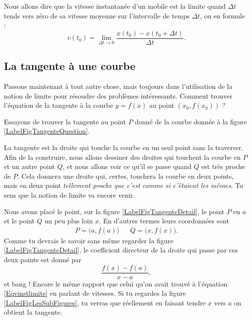 Nous allons dire que la vitesse instantanée d'un mobile est la limite quand $\Delta t$ tends vers zéro de sa vitesse moyenne sur l'intervalle de temps $\Delta t$, ou en formule :
\begin{equation}		\label{Eqvinstlimite}
	v(t_0)=\lim_{\Delta t\to 0}\frac{ x(t_0)-x(t_0+\Delta t) }{ \Delta t }.
\end{equation}

\subsection{La tangente à une courbe}

Passons maintenant à tout autre chose, mais toujours dans l'utilisation de la notion de limite pour résoudre des problèmes intéressants. Comment trouver l'équation de la tangente à la courbe $y=f(x)$ au point $(x_0,f(x_0))$ ?

Essayons de trouver la tangente au point $P$ donné de la courbe donnée à la figure \ref{LabelFigTangenteQuestion}.

\newcommand{\CaptionFigTangenteQuestion}{Comment trouver la tangente à la courbe au point $P$ ?}


La tangente est la droite qui touche la courbe en un seul point sans la traverser. Afin de la construire, nous allons dessiner des droites qui touchent la courbe en $P$ et un autre point $Q$, et nous allons voir ce qu'il se passe quand $Q$ est très proche de $P$. Cela donnera une droite qui, certes, touchera la courbe en deux points, mais en deux point \emph{tellement proche que c'est comme si c'étaient les mêmes}. Tu sens que la notion de limite va encore venir.


\newcommand{\CaptionFigTangenteDetail}{Traçons d'abord une corde entre le point $P$ et un point $Q$ un peu plus loin.}


Nous avons placé le point, sur la figure \ref{LabelFigTangenteDetail}, le point $P$ en $a$ et le point $Q$ un peu plus loin $x$. En d'autres termes leurs coordonnées sont
\begin{align}
	P=\big(a,f(a)\big)&& Q=\big(x,f(x)\big).
\end{align}
Comme tu devrais le savoir sans même regarder la figure \ref{LabelFigTangenteDetail}, le coefficient directeur de la droite qui passe par ces deux points est donné par
\begin{equation}
	\frac{ f(x)-f(a) }{ x-a },
\end{equation}
et bang ! Encore le même rapport que celui qu'on avait trouvé à l'équation \eqref{Eqvinstlimite} en parlant de vitesses. Si tu regardes la figure \ref{LabelFigLesSubFigures}, tu verras que réellement en faisant tendre $x$ vers $a$ on obtient la tangente.

